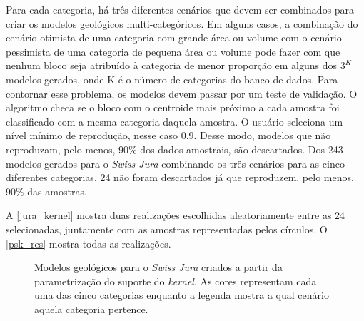 Para cada categoria, há três diferentes cenários que devem ser combinados para criar os modelos geológicos multi-categóricos. Em alguns casos, a combinação do cenário otimista de uma categoria com grande área ou volume com o cenário pessimista de uma categoria de pequena área ou volume pode fazer com que nenhum bloco seja atribuído à categoria de menor proporção em alguns dos $3^K$ modelos gerados, onde K é o número de categorias do banco de dados.
Para contornar esse problema, os modelos devem passar por um teste de validação. O algoritmo checa se o bloco com o centroide mais próximo a cada amostra foi classificado com a mesma categoria daquela amostra. O usuário seleciona um nível mínimo de reprodução, nesse caso 0.9. Desse modo, modelos que não reproduzam, pelo menos, 90\% dos dados amostrais, são descartados. Dos 243 modelos gerados para o \textit{Swiss Jura} combinando os três cenários para as cinco diferentes categorias, 24 não foram descartados já que reproduzem, pelo menos, 90\% das amostras.

A \autoref{jura_kernel} mostra duas realizações escolhidas aleatoriamente entre as 24 selecionadas, juntamente com as amostras representadas pelos círculos. O \autoref{psk_res} mostra todas as realizações.

\begin{figure}[H]
    \centering
    \caption{Modelos geológicos para o \textit{Swiss Jura} criados a partir da parametrização do suporte do \textit{kernel}. As cores representam cada uma das cinco categorias enquanto a legenda mostra a qual cenário aquela categoria pertence.} \label{jura_kernel}
     \hspace{1em}
\end{figure}

